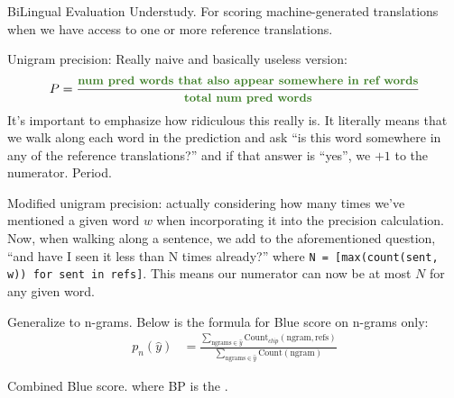 \documentclass[11pt]{article}
\begin{document}
BiLingual Evaluation Understudy. For scoring machine-generated translations when we have access to one or more reference translations.
\begin{compactitem}
	\item Unigram precision: Really naive and basically useless version:
	\begin{align}
		P = \frac{
			\mtgreen{num pred words that also appear somewhere in ref words} }{
			\mtgreen{total num pred words}
		}
	\end{align}
	It's important to emphasize how ridiculous this really is. It literally means that we walk along each word in the prediction and ask ``is this word somewhere in any of the reference translations?'' and if that answer is ``yes'', we ${+}1$ to the numerator. Period.
	
	\item Modified unigram precision: actually considering how many times we've mentioned a given word $w$ when incorporating it into the precision calculation. Now, when walking along a sentence, we add to the aforementioned question, ``\textellipsis and have I seen it less than N times already?'' where \texttt{N = [max(count(sent, w)) for sent in refs]}. This means our numerator can now be at most $N$ for any given word.
	
	\item Generalize to n-grams. Below is the formula for Blue score on n-grams only:
	\begin{align}
		p_n(\hat y)
			&= \frac{  
				\sum_{\text{ngrams} \in \hat y} \text{Count}_{clip}(\text{ngram}, \text{refs})
				 }{
				 \sum_{\text{ngrams} \in \hat y} \text{Count}(\text{ngram})
				}
	\end{align}
	
	\item Combined Blue score. 
	where BP is the . 
\end{compactitem}

\myspace
{}
\myspace
\end{document}
